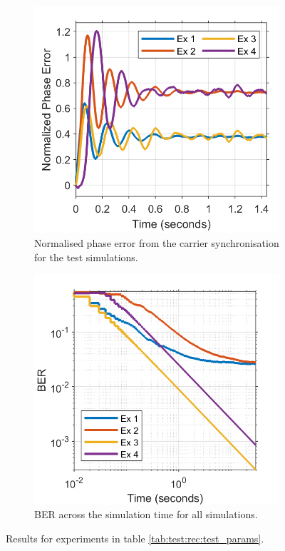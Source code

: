\documentclass[12pt,a4paper]{report}
\begin{document}
\begin{figure}
\centering
\begin{subfigure}{0.45\textwidth}
\centering
    \includegraphics[width = \textwidth]{Figures/phaseerr_time.png}
    \caption[Phase error of the receiver tests.]{Normalised phase error from the carrier synchronisation for the test simulations.}
    \label{fig:test:rec:phase}
\end{subfigure}
\hspace{0.05\textwidth}
\begin{subfigure}{0.45\textwidth}
\centering
    \includegraphics[width = \textwidth]{Figures/BER_Time.png}
    \caption[BER vs time of the receiver tests.]{BER across the simulation time for all simulations.}
    \label{fig:test:rec:ber_time}
\end{subfigure}
\caption[Results of the receiver test.]{Results for experiments in table \ref{tab:test:rec:test_params}.}
\end{figure}
\end{document}
